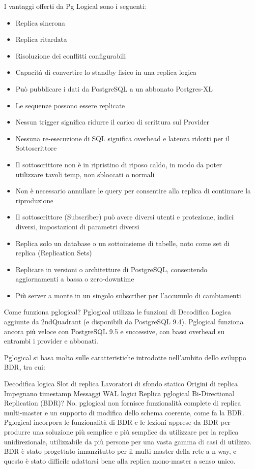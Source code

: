 I vantaggi offerti da Pg Logical sono i seguenti:
\begin{itemize}
\item
Replica sincrona
\item
Replica ritardata
\item
Risoluzione dei conflitti configurabili
\item
Capacit\`{a} di convertire lo standby fisico in una replica logica
\item
Pu\`{o} pubblicare i dati da PostgreSQL a un abbonato Postgres-XL
\item
Le sequenze possono essere replicate
\item
Nessun trigger significa ridurre il carico di scrittura sul Provider
\item
Nessuna re-esecuzione di SQL significa overhead e latenza ridotti per il Sottoscrittore
\item
Il sottoscrittore non \`{e} in ripristino di riposo caldo, in modo da poter utilizzare tavoli temp, non sbloccati o normali
\item
Non \`{e} necessario annullare le query per consentire alla replica di continuare la riproduzione
\item
Il sottoscrittore (Subscriber) pu\`{o} avere diversi utenti e protezione, indici diversi, impostazioni di parametri diversi
\item
Replica solo un database o un sottoinsieme di tabelle, noto come set di replica (Replication Sets)
\item
Replicare in versioni o architetture di PostgreSQL, consentendo aggiornamenti a bassa o zero-downtime
\item
Pi\`{u} server a monte in un singolo subscriber per l'accumulo di cambiamenti
\end{itemize}

Come funziona pglogical?
Pglogical utilizza le funzioni di Decodifica Logica aggiunte da 2ndQuadrant (e disponibili da PostgreSQL 9.4). Pglogical funziona ancora più veloce con PostgreSQL 9.5 e successive, con bassi overhead su entrambi i provider e abbonati.

Pglogical si basa molto sulle caratteristiche introdotte nell'ambito dello sviluppo BDR, tra cui:

Decodifica logica
Slot di replica
Lavoratori di sfondo statico
Origini di replica
Impegnano timestamp
Messaggi WAL logici
Replica pglogical Bi-Directional Replication (BDR)?
No. pglogical non fornisce funzionalità complete di replica multi-master e un supporto di modifica dello schema coerente, come fa la BDR. Pglogical incorpora le funzionalità di BDR e le lezioni apprese da BDR per produrre una soluzione più semplice e più semplice da utilizzare per la replica unidirezionale, utilizzabile da più persone per una vasta gamma di casi di utilizzo. BDR è stato progettato innanzitutto per il multi-master della rete a n-way, e questo è stato difficile adattarsi bene alla replica mono-master a senso unico.

